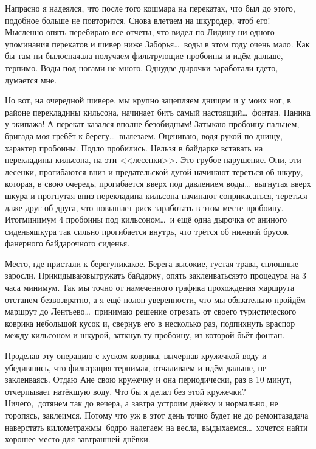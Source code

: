 Напрасно я надеялся, что после того кошмара на перекатах, что был до этого, подобное больше не повторится. Снова влетаем на шкуродер, чтоб его! Мысленно опять перебираю все отчеты, что видел по Лиди\mdash ну ни одного упоминания перекатов и шивер ниже Заборья\ldots~воды в этом году очень мало. Как бы там ни было\mdash сначала получаем фильтрующие пробоины и идём дальше, терпимо. Воды под ногами не много. Одну\sdash две дырочки заработали где\sdash то, думается мне. 

Но вот, на очередной шивере, мы крупно зацепляем днищем и у моих ног, в районе перекладины кильсона, начинает бить самый настоящий\ldots~фонтан. Паника у экипажа! А перекат казался вполне безобидным! Затыкаю пробоину пальцем, бригада моя гребёт к берегу\ldots~вылезаем. Оцениваю, водя рукой по днищу, характер пробоины. Подло пробились. Нельзя в байдарке вставать на перекладины кильсона, на эти <<лесенки>>. Это грубое нарушение. Они, эти лесенки, прогибаются вниз и предательской дугой начинают тереться об шкуру, которая, в свою очередь, прогибается вверх под давлением воды\ldots~выгнутая вверх шкура и прогнутая вниз перекладина кильсона начинают соприкасаться, тереться даже друг об друга, что повышает риск заработать в этом месте пробоину. Итог\mdash минимум 4 пробоины под кильсоном\ldots~и ещё одна дырочка от аниного сиденья\mdash шкура так сильно прогибается внутрь, что трётся об нижний брусок фанерного байдарочного сиденья. 

Место, где пристали к берегу\mdash никакое. Берега высокие, густая трава, сплошные заросли. Прикидываю\mdash выгружать байдарку, опять заклеиваться\mdash это процедура на 3 часа минимум. Так мы точно от намеченного графика прохождения маршрута отстанем безвозвратно, а я ещё полон уверенности, что мы обязательно пройдём маршрут до Лентьево\ldots~принимаю решение отрезать от своего туристического коврика небольшой кусок и, свернув его в несколько раз, подпихнуть враспор между кильсоном и шкурой, заткнув ту пробоину, из которой бьёт фонтан. 

Проделав эту операцию с куском коврика, вычерпав кружечкой воду и убедившись, что фильтрация терпимая, отчаливаем и идём дальше, не заклеиваясь. Отдаю Ане свою кружечку и она периодически, раз в 10 минут, отчерпывает натёкшую воду. Что бы я делал без этой кружечки? Ничего,~дотянем так до вечера, а завтра устроим днёвку и нормально, не торопясь, заклеимся. Потому что уж в этот день точно будет не до ремонта\mdash задача наверстать километраж\mdash мы~бодро налегаем на весла, выдыхаемся\ldots~хочется найти хорошее место для завтрашней днёвки.

